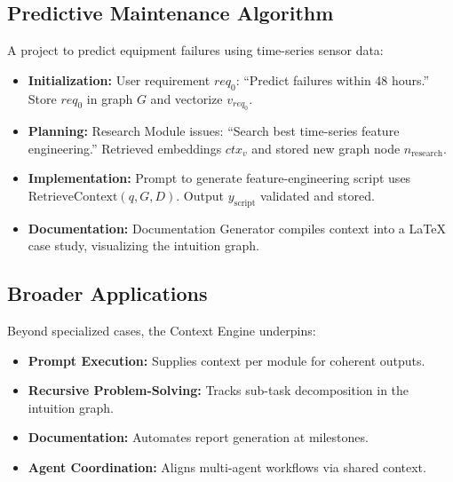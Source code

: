 \documentclass[11pt]{article}
\begin{document}
\subsection{Predictive Maintenance Algorithm}
\label{subsec:predictive_maintenance}

A project to predict equipment failures using time-series sensor data:

\begin{itemize}
  \item \textbf{Initialization:}  
    User requirement \(req_0\): “Predict failures within 48 hours.”  
    Store \(req_0\) in graph \(G\) and vectorize \(v_{req_0}\).

  \item \textbf{Planning:}  
    Research Module issues:  
    “Search best time-series feature engineering.”  
    Retrieved embeddings \(ctx_v\) and stored new graph node \(n_{\mathrm{research}}\).
  
  \item \textbf{Implementation:}  
    Prompt to generate feature-engineering script uses  
    \(\mathrm{RetrieveContext}(q,G,D)\).  
    Output \(y_{\mathrm{script}}\) validated and stored.

  \item \textbf{Documentation:}  
    Documentation Generator compiles context into a LaTeX case study, visualizing the intuition graph.
\end{itemize}

\subsection{Broader Applications}
\label{subsec:broader_applications}

Beyond specialized cases, the Context Engine underpins:

\begin{itemize}
  \item \textbf{Prompt Execution:} Supplies context per module for coherent outputs.  
  \item \textbf{Recursive Problem-Solving:} Tracks sub-task decomposition in the intuition graph.  
  \item \textbf{Documentation:} Automates report generation at milestones.  
  \item \textbf{Agent Coordination:} Aligns multi-agent workflows via shared context.
\end{itemize}
\end{document}
